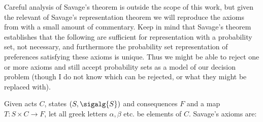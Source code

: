Careful analysis of Savage's theorem is outside the scope of this work, but given the relevant of Savage's representation theorem we will reproduce the axioms from \citet{savage_foundations_1954} with a small amount of commentary. Keep in mind that Savage's theorem establishes that the following are sufficient for representation with a probability set, not necessary, and furthermore the probability set representation of preferences satisfying these axioms is unique. Thus we might be able to reject one or more axioms and still accept probability sets as a model of our decision problem (though I do not know which can be rejected, or what they might be replaced with).

Given acts $C$, states $(S,\sigalg{S})$ and consequences $F$ and a map $T:S\times C\to F$, let all greek letters $\alpha,\beta$ etc. be elements of $C$. Savage's axioms are:
